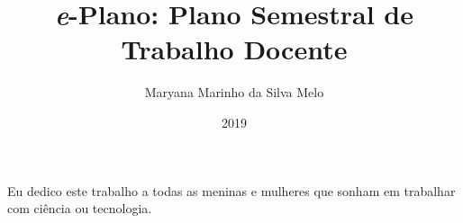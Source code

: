 \documentclass[pt,twoside,onehalfspacing,bsc]{ifgtcc}
\title{{\emph e-Plano}: Plano Semestral de Trabalho Docente}
\date{2019}
\author{Maryana Marinho da Silva Melo}
\begin{document}
\frontmatter

\frontpage

\presentationpage

\begin{fichacatalografica}
\FakeFichaCatalografica %
\end{fichacatalografica}



\begin{ata}
\begin{figure}
	\centering 
	
\end{figure}
\end{ata}


\begin{ata}
	\begin{figure}
		\centering 
		
	\end{figure}
\end{ata}



\begin{dedicatory}
Eu dedico este trabalho a todas as meninas e mulheres que sonham em trabalhar com ciência ou tecnologia. 
\end{dedicatory}

% 


\resumo
{\parindent0pt
	
}

\abstract
{\parindent0pt
	
}

\listoffigures


\listoftables

\listofacronyms


\tableofcontents

\mainmatter








\begin{references}
  
\end{references}


\end{document}
